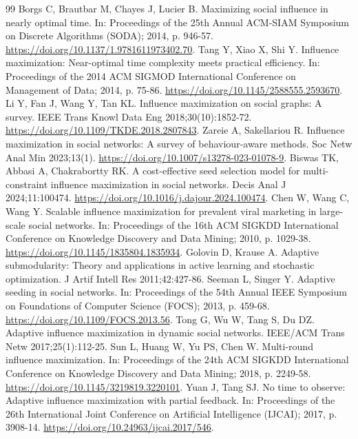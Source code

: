 \documentclass[preprint,11pt]{elsarticle}
\theoremstyle{definition}
\theoremstyle{remark}
\begin{document}
\begin{thebibliography}{99}
Borgs C, Brautbar M, Chayes J, Lucier B. Maximizing social influence in nearly optimal time. In: Proceedings of the 25th Annual ACM-SIAM Symposium on Discrete Algorithms (SODA); 2014, p. 946-57. \url{https://doi.org/10.1137/1.9781611973402.70}.
Tang Y, Xiao X, Shi Y. Influence maximization: Near-optimal time complexity meets practical efficiency. In: Proceedings of the 2014 ACM SIGMOD International Conference on Management of Data; 2014, p. 75-86. \url{https://doi.org/10.1145/2588555.2593670}.
Li Y, Fan J, Wang Y, Tan KL. Influence maximization on social graphs: A survey. IEEE Trans Knowl Data Eng 2018;30(10):1852-72. \url{https://doi.org/10.1109/TKDE.2018.2807843}.
Zareie A, Sakellariou R. Influence maximization in social networks: A survey of behaviour-aware methods. Soc Netw Anal Min 2023;13(1). \url{https://doi.org/10.1007/s13278-023-01078-9}.
Biswas TK, Abbasi A, Chakrabortty RK. A cost-effective seed selection model for multi-constraint influence maximization in social networks. Decis Anal J 2024;11:100474. \url{https://doi.org/10.1016/j.dajour.2024.100474}.
Chen W, Wang C, Wang Y. Scalable influence maximization for prevalent viral marketing in large-scale social networks. In: Proceedings of the 16th ACM SIGKDD International Conference on Knowledge Discovery and Data Mining; 2010, p. 1029-38. \url{https://doi.org/10.1145/1835804.1835934}.
Golovin D, Krause A. Adaptive submodularity: Theory and applications in active learning and stochastic optimization. J Artif Intell Res 2011;42:427-86.
Seeman L, Singer Y. Adaptive seeding in social networks. In: Proceedings of the 54th Annual IEEE Symposium on Foundations of Computer Science (FOCS); 2013, p. 459-68. \url{https://doi.org/10.1109/FOCS.2013.56}.
Tong G, Wu W, Tang S, Du DZ. Adaptive influence maximization in dynamic social networks. IEEE/ACM Trans Netw 2017;25(1):112-25.
Sun L, Huang W, Yu PS, Chen W. Multi-round influence maximization. In: Proceedings of the 24th ACM SIGKDD International Conference on Knowledge Discovery and Data Mining; 2018, p. 2249-58. \url{https://doi.org/10.1145/3219819.3220101}.
Yuan J, Tang SJ. No time to observe: Adaptive influence maximization with partial feedback. In: Proceedings of the 26th International Joint Conference on Artificial Intelligence (IJCAI); 2017, p. 3908-14. \url{https://doi.org/10.24963/ijcai.2017/546}.

\end{thebibliography}
\end{document}
